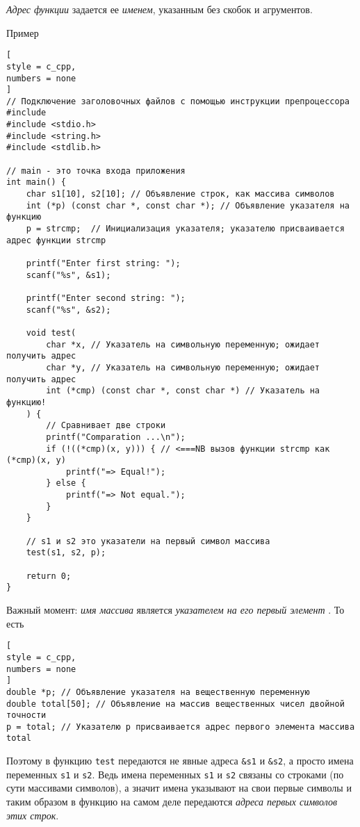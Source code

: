 \documentclass[%
	11pt,
	a4paper,
	utf8,
		]{article}
\begin{document}
\emph{Адрес функции} задается ее \emph{именем}, указанным без скобок и агрументов.

Пример
\begin{lstlisting}[
style = c_cpp,
numbers = none
]
// Подключение заголовочных файлов с помощью инструкции препроцессора #include
#include <stdio.h>
#include <string.h>
#include <stdlib.h>

// main - это точка входа приложения
int main() {
	char s1[10], s2[10]; // Объявление строк, как массива символов
	int (*p) (const char *, const char *); // Объявление указателя на функцию
	p = strcmp;  // Инициализация указателя; указателю присваивается адрес функции strcmp
	
	printf("Enter first string: ");
	scanf("%s", &s1);
	
	printf("Enter second string: ");
	scanf("%s", &s2);
	
	void test(
		char *x, // Указатель на символьную переменную; ожидает получить адрес
		char *y, // Указатель на символьную переменную; ожидает получить адрес
		int (*cmp) (const char *, const char *) // Указатель на функцию!
	) {
		// Сравнивает две строки
		printf("Comparation ...\n");
		if (!((*cmp)(x, y))) { // <===NB вызов функции strcmp как (*cmp)(x, y)
			printf("=> Equal!");
		} else {
			printf("=> Not equal.");
		}
	}
	
	// s1 и s2 это указатели на первый символ массива
	test(s1, s2, p);
	
	return 0;
}
\end{lstlisting}

Важный момент: \emph{имя массива} является \emph{указателем на его первый элемент} \cite[]{koltzov-c-lang:2019}. То есть
\begin{lstlisting}[
style = c_cpp,
numbers = none
]
double *p; // Объявление указателя на вещественную переменную
double total[50]; // Объявление на массив вещественных чисел двойной точности
p = total; // Указателю p присваивается адрес первого элемента массива total
\end{lstlisting}

Поэтому в функцию \texttt{test} передаются не явные адреса \texttt{\&s1} и \texttt{\&s2}, а просто имена переменных \texttt{s1} и \texttt{s2}. Ведь имена переменных \texttt{s1} и \texttt{s2} связаны со строками (по сути массивами символов), а значит имена указывают на свои первые символы и таким образом в функцию на самом деле передаются \emph{адреса первых символов этих строк}. 


\begin{thebibliography}{99}
\end{thebibliography}


\lstlistoflistings{}
\end{document}
